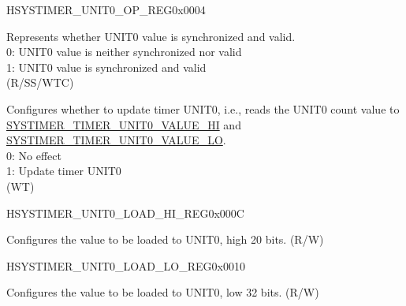 \begin{register}{H}{SYSTIMER\_UNIT0\_OP\_REG}{0x0004}\label{regdesc:SYSTIMERUNIT0OPREG}
%
%
%
%
\regnewline%
\begin{regdesc}\begin{reglist}
\label{fielddesc:SYSTIMERTIMERUNIT0VALUEVALID}\item [SYSTIMER\_TIMER\_UNIT0\_VALUE\_VALID] Represents whether UNIT0 value is synchronized and valid.\\
0: UNIT0 value is neither synchronized nor valid\\
1: UNIT0 value is synchronized and valid\\
(R/SS/WTC)
\label{fielddesc:SYSTIMERTIMERUNIT0UPDATE}\item [SYSTIMER\_TIMER\_UNIT0\_UPDATE] Configures whether to update timer UNIT0, i.e., reads the UNIT0 count value to \hyperref[fielddesc:SYSTIMERTIMERUNIT0VALUEHI]{SYSTIMER\_TIMER\_UNIT0\_VALUE\_HI} and \hyperref[fielddesc:SYSTIMERTIMERUNIT0VALUELO]{SYSTIMER\_TIMER\_UNIT0\_VALUE\_LO}. \\
0: No effect\\
1: Update timer UNIT0 \\
(WT)
\end{reglist}\end{regdesc}
\end{register}


\begin{register}{H}{SYSTIMER\_UNIT0\_LOAD\_HI\_REG}{0x000C}\label{regdesc:SYSTIMERUNIT0LOADHIREG}
%
%
\regnewline%
\begin{regdesc}\begin{reglist}
\label{fielddesc:SYSTIMERTIMERUNIT0LOADHI}\item [SYSTIMER\_TIMER\_UNIT0\_LOAD\_HI] Configures the value to be loaded to UNIT0, high 20 bits. (R/W)
\end{reglist}\end{regdesc}
\end{register}


\begin{register}{H}{SYSTIMER\_UNIT0\_LOAD\_LO\_REG}{0x0010}\label{regdesc:SYSTIMERUNIT0LOADLOREG}
%
\regnewline%
\begin{regdesc}\begin{reglist}
\label{fielddesc:SYSTIMERTIMERUNIT0LOADLO}\item [SYSTIMER\_TIMER\_UNIT0\_LOAD\_LO] Configures the value to be loaded to UNIT0, low 32 bits. (R/W)
\end{reglist}\end{regdesc}
\end{register}


